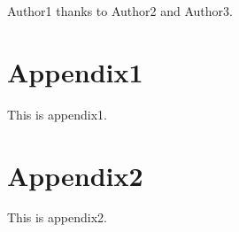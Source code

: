\documentclass[
aps, %
prb, 
twocolumn, %
10pt, %
superscriptaddress, %
amsfont, %
amssymb, %
amsmath, %
showkeys, %
floats, %
final, 
letterpaper, %
balancelastpage, %
flushbottom, %
citeautoscript,
]{revtex4-2}
\begin{document}
\begin{acknowledgments}
Author1 thanks to Author2 and Author3.
\end{acknowledgments}



\onecolumngrid
\newpage

\appendix
\section*{Appendix1}
This is appendix1.

\section*{Appendix2}
This is appendix2.
\end{document}
